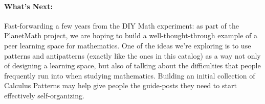 \paragraph{What's Next:} Fast-forwarding a few years from the DIY Math
experiment: as part of the PlanetMath project, we are hoping to build a
well-thought-through example of a peer learning space for mathematics.
One of the ideas we're exploring is to use patterns and antipatterns
(exactly like the ones in this catalog) as a way not only of designing a
learning space, but also of talking about the difficulties that people
frequently run into when studying mathematics. Building an initial
collection of Calculus Patterns may help give people the guide-posts
they need to start effectively self-organizing.


